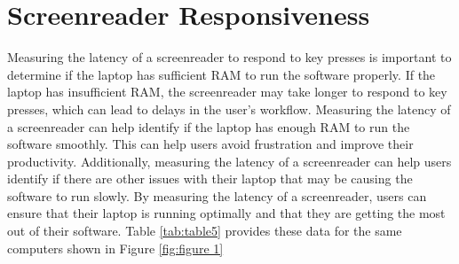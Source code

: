 \documentclass[12pt,letterpaper,twoside]{extreport}
\begin{document}
\pagebreak
\hypertarget{screenreader-response}{}\section{Screenreader Responsiveness}\label{screenreader-response}
Measuring the latency of a screenreader to respond to key presses is important to determine if the laptop has sufficient RAM to run the software properly. If the laptop has insufficient RAM, the screenreader may take longer to respond to key presses, which can lead to delays in the user’s workflow. Measuring the latency of a screenreader can help identify if the laptop has enough RAM to run the software smoothly. This can help users avoid frustration and improve their productivity. Additionally, measuring the latency of a screenreader can help users identify if there are other issues with their laptop that may be causing the software to run slowly. By measuring the latency of a screenreader, users can ensure that their laptop is running optimally and that they are getting the most out of their software. Table \ref{tab:table5} provides these data for the same computers shown in Figure \ref{fig:figure 1}
\end{document}
